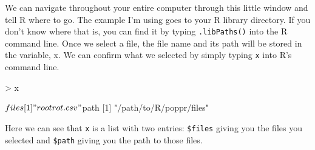 \documentclass[letterpaper]{article}
\begin{document}
\begin{center}
\end{center}
\newpage

We can navigate throughout your entire computer through this little window and tell R where to go. The example I'm using goes to your R library directory. If you don't know where that is, you can find it by typing \texttt{.libPaths()} into the R command line.
Once we select a file, the file name and its path will be stored in the variable, x. We can confirm what we selected by simply typing \texttt{x} into R's command line.
\begin{Schunk}
\begin{Sinput}
> x
\end{Sinput}
\begin{Soutput}
$files
[1] "rootrot.csv"

$path
[1] "/path/to/R/poppr/files"
\end{Soutput}
\end{Schunk}
Here we can see that \texttt{x} is a list with two entries: \texttt{\$files} giving you the files you selected and \texttt{\$path} giving you the path to those files. 
\end{document}
